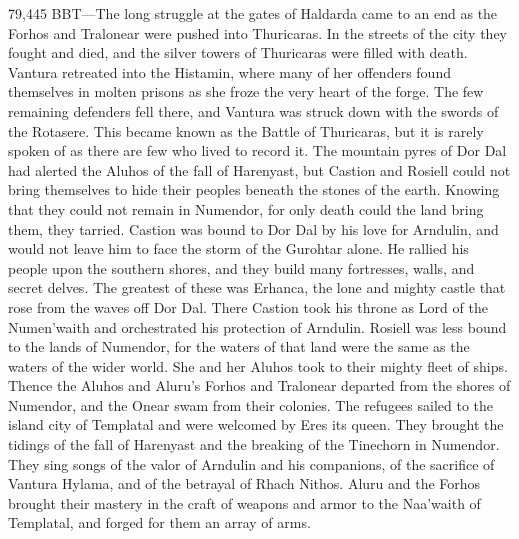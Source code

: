 \documentclass[smalldemyvopaper,11pt,twoside,onecolumn,openright,extrafontsizes]{memoir}
\begin{document}
79,445 BBT—The long struggle at the gates of Haldarda came to an end as the Forhos and Tralonear were pushed into Thuricaras. In the streets of the city they fought and died, and the silver towers of Thuricaras were filled with death. Vantura retreated into the Histamin, where many of her offenders found themselves in molten prisons as she froze the very heart of the forge. The few remaining defenders fell there, and Vantura was struck down with the swords of the Rotasere. This became known as the Battle of Thuricaras, but it is rarely spoken of as there are few who lived to record it.
	The mountain pyres of Dor Dal had alerted the Aluhos of the fall of Harenyast, but Castion and Rosiell could not bring themselves to hide their peoples beneath the stones of the earth. Knowing that they could not remain in Numendor, for only death could the land bring them, they tarried. Castion was bound to Dor Dal by his love for Arndulin, and would not leave him to face the storm of the Gurohtar alone. He rallied his people upon the southern shores, and they build many fortresses, walls, and secret delves. The greatest of these was Erhanca, the lone and mighty castle that rose from the waves off Dor Dal. There Castion took his throne as Lord of the Numen’waith and orchestrated his protection of Arndulin. Rosiell was less bound to the lands of Numendor, for the waters of that land were the same as the waters of the wider world. She and her Aluhos took to their mighty fleet of ships. Thence the Aluhos and Aluru’s Forhos and Tralonear departed from the shores of Numendor, and the Onear swam from their colonies. The refugees sailed to the island city of Templatal and were welcomed by Eres its queen. They brought the tidings of the fall of Harenyast and the breaking of the Tinechorn in Numendor. They sing songs of the valor of Arndulin and his companions, of the sacrifice of Vantura Hylama, and of the betrayal of Rhach Nithos. Aluru and the Forhos brought their mastery in the craft of weapons and armor to the Naa’waith of Templatal, and forged for them an array of arms.
\end{document}

